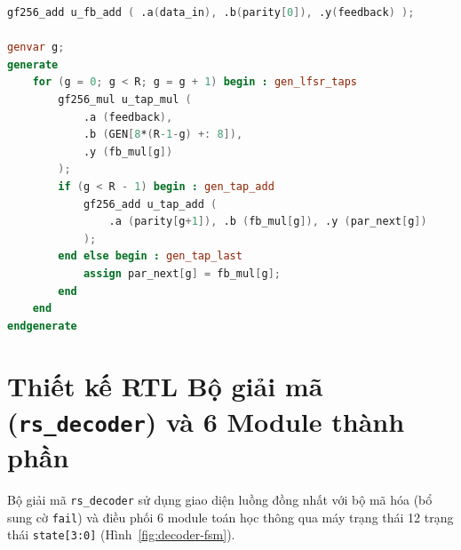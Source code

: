 \begin{lstlisting}[language=Verilog]
gf256_add u_fb_add ( .a(data_in), .b(parity[0]), .y(feedback) );

genvar g;
generate
    for (g = 0; g < R; g = g + 1) begin : gen_lfsr_taps
        gf256_mul u_tap_mul (
            .a (feedback),
            .b (GEN[8*(R-1-g) +: 8]),
            .y (fb_mul[g])
        );
        if (g < R - 1) begin : gen_tap_add
            gf256_add u_tap_add (
                .a (parity[g+1]), .b (fb_mul[g]), .y (par_next[g])
            );
        end else begin : gen_tap_last
            assign par_next[g] = fb_mul[g];
        end
    end
endgenerate
\end{lstlisting}

\section{Thiết kế RTL Bộ giải mã (\texttt{rs\_decoder}) và 6 Module thành phần}
\label{sec:rs-decoder}

Bộ giải mã \texttt{rs\_decoder} sử dụng giao diện luồng đồng nhất với bộ mã hóa (bổ sung cờ \texttt{fail}) và điều phối 6 module toán học thông qua máy trạng thái 12 trạng thái \texttt{state[3:0]} (Hình~\ref{fig:decoder-fsm}).

